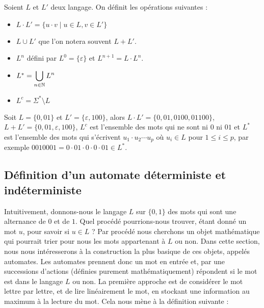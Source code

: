 \begin{defi}
    Soient $L$ et $L'$ deux langage. On définit les opérations suivantes :
    \begin{itemize}[label=$\bullet$]
        \item $L\cdot L' = \{ u\cdot v \mid u\in L, v \in L'\}$
        \item $L\cup L'$ que l'on notera souvent $L + L'$.
        \item $L^n$ défini par $L^0 = \{\varepsilon\}$ et $L^{n+1} = L\cdot L^n$.
        \item $L^* = \displaystyle{\bigcup_{n\in\mathbb{N}}L^n}$
        \item $L^c = \Sigma^* \setminus L$
    \end{itemize}
\end{defi}

\begin{expl}
    Soit $L = \{0,01\}$ et $L' = \{\varepsilon,100\}$, alors $L\cdot L' = \{0,01,0100,01100\}$, $L+L' = \{0,01,\varepsilon,100\}$, $L^c$ est l'ensemble des mots qui ne sont ni $0$ ni $01$ et $L^*$ est l'ensemble des mots qui s'écrivent $u_1\cdot u_2\cdots u_p$ où $u_i\in L$ pour $1\leq i \leq p$, par exemple $0010001 = 0\cdot 01 \cdot 0\cdot 0 \cdot 01 \in L^*$.
\end{expl}

\subsection{Définition d'un automate déterministe et indéterministe}

Intuitivement, donnons-nous le langage $L$ sur $\{0,1\}$ des mots qui sont une alternance de $0$ et de $1$. Quel procédé pourrions-nous trouver, étant donné un mot $u$, pour savoir si $u\in L$ ? Par procédé nous cherchons un objet mathématique qui pourrait trier pour nous les mots appartenant à $L$ ou non. Dans cette section, nous nous intéresserons à la construction la plus basique de ces objets, appelés automates. Les automates prennent donc un mot en entrée et, par une successions d'actions (définies purement mathématiquement) répondent si le mot est dans le langage $L$ ou non. La première approche est de considérer le mot lettre par lettre, et de \og lire\fg{} linéairement le mot, en stockant une information au maximum à la lecture du mot. Cela nous mène à la définition suivante :

